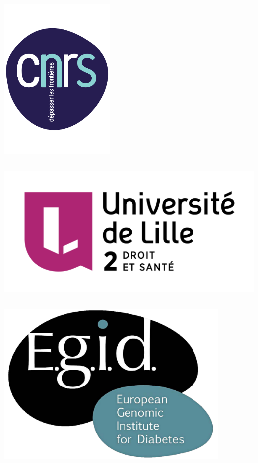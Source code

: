 \documentclass[a0,portrait]{a0poster}
\begin{document}
\begin{center}
\vfill
{\hspace{2.5cm}\includegraphics[height=8cm, keepaspectratio]{figures/logo_cnrs.pdf} \hspace{10cm} \includegraphics[height=8cm, keepaspectratio]{figures/UL2-WEB-2014.png} \hspace{10cm} \includegraphics[height=8cm, keepaspectratio]{figures/logo_egid.pdf}}
\end{center}
\end{document}
